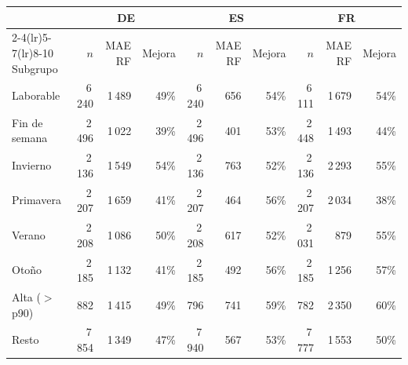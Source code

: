 \begin{tabular}{lrrrrrrrrr}
\toprule
 & \multicolumn{3}{c}{DE} & \multicolumn{3}{c}{ES} & \multicolumn{3}{c}{FR} \\
\cmidrule(lr){2-4}\cmidrule(lr){5-7}\cmidrule(lr){8-10}
Subgrupo & $n$ & MAE RF & Mejora & $n$ & MAE RF & Mejora & $n$ & MAE RF & Mejora \\
\midrule
Laborable & 6\,240 & 1\,489 & 49\% & 6\,240 & 656 & 54\% & 6\,111 & 1\,679 & 54\% \\
Fin de semana & 2\,496 & 1\,022 & 39\% & 2\,496 & 401 & 53\% & 2\,448 & 1\,493 & 44\% \\
\midrule
Invierno & 2\,136 & 1\,549 & 54\% & 2\,136 & 763 & 52\% & 2\,136 & 2\,293 & 55\% \\
Primavera & 2\,207 & 1\,659 & 41\% & 2\,207 & 464 & 56\% & 2\,207 & 2\,034 & 38\% \\
Verano & 2\,208 & 1\,086 & 50\% & 2\,208 & 617 & 52\% & 2\,031 & 879 & 55\% \\
Otoño & 2\,185 & 1\,132 & 41\% & 2\,185 & 492 & 56\% & 2\,185 & 1\,256 & 57\% \\
\midrule
Alta ($>$ p90) & 882 & 1\,415 & 49\% & 796 & 741 & 59\% & 782 & 2\,350 & 60\% \\
Resto & 7\,854 & 1\,349 & 47\% & 7\,940 & 567 & 53\% & 7\,777 & 1\,553 & 50\% \\
\bottomrule
\end{tabular}